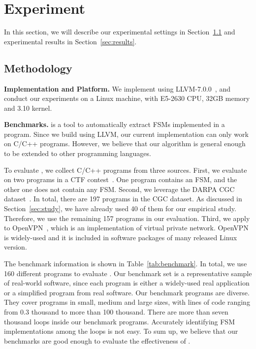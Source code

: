 \section{Experiment}
\label{sec:exp}


In this section, we will describe our experimental settings in Section~\ref{sec:meth} 
and experimental results in Section~\ref{sec:results}. 

\subsection{Methodology}
\label{sec:meth}

\noindent\textbf{Implementation and Platform.}
We implement \Tool{} using LLVM-7.0.0~\cite{LLVM},
and conduct our experiments on a Linux machine,
with E5-2630 CPU, 32GB memory and 3.10 kernel.

\noindent\textbf{Benchmarks.}
\Tool{} is a tool to automatically extract FSMs implemented in a program.
Since we build \Tool{} using LLVM,
our current implementation can only work on C/C++ programs.
However, we believe that our algorithm is general enough
to be extended to other programming languages.

To evaluate \Tool{}, we collect C/C++ programs from three sources.
First, we evaluate \Tool{} on two programs in a CTF contest~\cite{ctf}.
One program contains an FSM, and the other one does not contain any FSM.
Second, we leverage the DARPA CGC dataset~\cite{CGC}.
In total, there are 197 programs in the CGC dataset.
As discussed in Section~\ref{sec:study},
we have already used 40 of them for our empirical study.
Therefore, we use the remaining 157 programs in our evaluation.
Third, we apply \Tool{} to OpenVPN~\cite{openvpn},
which is an implementation of virtual private network. 
OpenVPN is widely-used and it
is included in software packages of many released Linux version.





The benchmark information is shown in Table~\ref{tab:benchmark}.
In total, we use 160 different programs to evaluate \Tool{}.
Our benchmark set is a representative sample of real-world software,
since each program is either a widely-used real application or a simplified program
from real software.
Our benchmark programs are diverse.
They cover programs in small, medium and large sizes,
with lines of code ranging from 0.3 thousand to more than 100 thousand.
There are more than seven thousand
loops inside our benchmark programs. Accurately
identifying FSM implementations among the loops is not easy.
To sum up, we believe that our benchmarks are good
enough to evaluate the effectiveness of \Tool{}.


